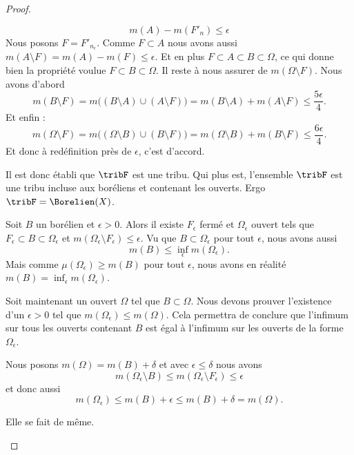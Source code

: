 \begin{proof}
\begin{subproof}
\begin{subproof}
			\begin{equation}
				m(A)-m(F'_{n})\leq \epsilon
			\end{equation}
			Nous posons \( F=F'_{n_{\epsilon}}\). Comme \( F\subset A\) nous avons aussi \( m(A\setminus F)=m(A)-m(F)\leq \epsilon\). Et en plus \( F\subset A\subset B\subset \Omega\), ce qui donne bien la propriété voulue \( F\subset B\subset \Omega\). Il reste à nous assurer de \( m(\Omega\setminus F)\). Nous avons d'abord
			\begin{equation}
				m(B\setminus F)=m\big( (B\setminus A)\cup (A\setminus F) \big)=m(B\setminus A)+m(A\setminus F)\leq \frac{ 5\epsilon }{ 4 }.
			\end{equation}
			Et enfin :
			\begin{equation}
				m(\Omega\setminus F)=m\big( (\Omega\setminus B)\cup (B\setminus F) \big)=m(\Omega\setminus B)+m(B\setminus F)\leq \frac{ 6\epsilon }{ 4 }.
			\end{equation}
			Et donc à redéfinition près de \( \epsilon\), c'est d'accord.
		\end{subproof}

		Il est donc établi que \( \tribF\) est une tribu. Qui plus est, l'ensemble \( \tribF\) est une tribu incluse aux boréliens et contenant les ouverts. Ergo \( \tribF=\Borelien(X)\).

		Soit \( B\) un borélien et \( \epsilon>0\). Alors il existe \( F_{\epsilon}\) fermé et \( \Omega_{\epsilon} \) ouvert tels que \( F_{\epsilon}\subset B\subset \Omega_{\epsilon}\) et \( m(\Omega_{\epsilon}\setminus F_{\epsilon})\leq \epsilon\). Vu que \( B\subset \Omega_{\epsilon}\) pour tout \( \epsilon\), nous avons aussi
		\begin{equation}
			m(B)\leq \inf_{\epsilon}m(\Omega_{\epsilon}).
		\end{equation}
		Mais comme \( \mu(\Omega_{\epsilon})\geq m(B)\) pour tout \( \epsilon\), nous avons en réalité \( m(B)=\inf_{\epsilon}m(\Omega_{\epsilon})\).

		Soit maintenant un ouvert \( \Omega\) tel que \( B\subset \Omega\). Nous devons prouver l'existence d'un \( \epsilon>0\) tel que \( m(\Omega_{\epsilon})\leq m(\Omega)\). Cela permettra de conclure que l'infimum sur tous les ouverts contenant \( B\) est égal à l'infimum sur les ouverts de la forme \( \Omega_{\epsilon}\).

		Nous posons \( m(\Omega)=m(B)+\delta\) et avec \( \epsilon\leq \delta\) nous avons
		\begin{equation}
			m(\Omega_{\epsilon}\setminus B)\leq m(\Omega_{\epsilon}\setminus F_{\epsilon})\leq \epsilon
		\end{equation}
		et donc aussi
		\begin{equation}
			m(\Omega_{\epsilon})\leq m(B)+\epsilon\leq m(B)+\delta=m(\Omega).
		\end{equation}

		Elle se fait de même.
	\end{subproof}
\end{proof}

